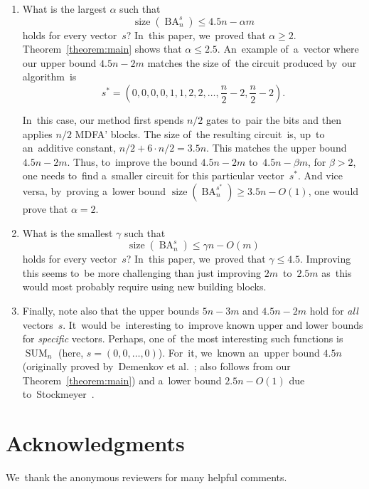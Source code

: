 \documentclass[a4paper, UKenglish, cleveref, autoref,  thm-restate, anonymous]{lipics-v2021}
\DeclareMathOperator{\SUM}{SUM}
\DeclareMathOperator{\BA}{BA}
\DeclareMathOperator{\size}{size}
\begin{document}
    \begin{enumerate}
        \item What is the largest $\alpha$ such that
        \[\size(\BA_n^s) \le 4.5n-\alpha m\]
        holds for every vector~$s$? In~this paper, we~proved that $\alpha \ge 2$.
        Theorem~\ref{theorem:main} shows that $\alpha \le 2.5$. An~example
        of~a~vector where our upper bound $4.5n-2m$ matches the size of~the circuit
        produced by~our algorithm~is
        \[s^*=\left(0,0,0,0,1,1,2,2,\dotsc,\frac{n}{2}-2, \frac{n}{2}-2\right).\]
        \begin{center}
        \end{center}
        In~this case, our method first spends $n/2$ gates to~pair the bits and then applies $n/2$ MDFA' blocks. The size of~the resulting circuit~is, up~to an~additive constant, $n/2+6\cdot n/2=3.5n$. This matches the upper bound $4.5n-2m$. Thus, to~improve the bound $4.5n-2m$ to~$4.5n-\beta m$, for $\beta > 2$, one needs to~find a~smaller circuit for this particular vector~$s^*$.
        And vice versa, by~proving a~lower bound $\size(\BA_n^{s^*}) \ge 3.5n-O(1)$,
        one would prove that $\alpha=2$.

        \item What is the smallest $\gamma$ such that
        \[\size(\BA_n^s) \le \gamma n-O(m)\]
        holds for every vector~$s$? In~this paper,
        we~proved that $\gamma \le 4.5$.
        Improving this seems to~be more challenging than just improving $2m$~to~$2.5m$ as~this would most probably require using new building blocks.

        \item Finally, note also that the upper bounds $5n-3m$ and $4.5n-2m$ hold for \emph{all} vectors~$s$.
        It~would be~interesting to~improve known upper and lower bounds for \emph{specific} vectors. Perhaps, one of~the most interesting such functions is~$\SUM_n$ (here, $s=(0,0,\dotsc,0)$). For~it, we~known an~upper bound $4.5n$ (originally proved
        by~Demenkov et al.~\cite{DBLP:journals/ipl/DemenkovKKY10}; also follows from our Theorem~\ref{theorem:main}) and a~lower bound $2.5n-O(1)$ due to~Stockmeyer~\cite{DBLP:journals/mst/Stockmeyer77}.
    \end{enumerate}

    \section*{Acknowledgments}
    We~thank the anonymous reviewers for many helpful comments.

    
\end{document}
